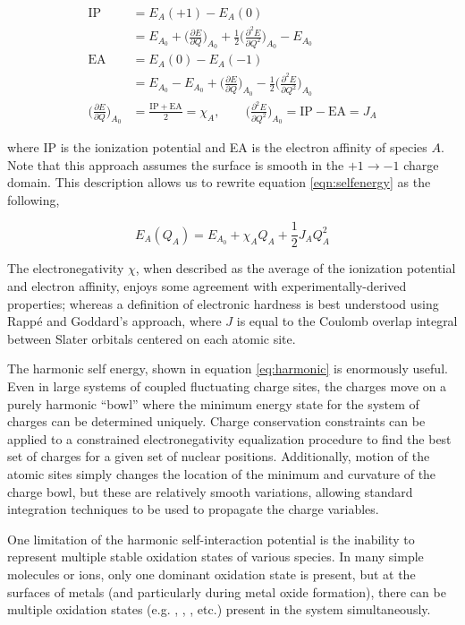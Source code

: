 \begin{align*}
\mathrm{IP} &= E_A(+1) - E_A(0) \\
& = E_{A_0} + \bigg (\frac{\partial E}{\partial Q}\bigg)_{A_0} + \frac{1}{2}\bigg(\frac{\partial^2E}{\partial Q^2}\bigg)_{A_0} - E_{A_0} \\
\mathrm{EA} &= E_A(0) - E_A(-1) \\
& = E_{A_0} - E_{A_0} + \bigg (\frac{\partial E}{\partial Q}\bigg)_{A_0} - \frac{1}{2}\bigg(\frac{\partial^2E}{\partial Q^2}\bigg)_{A_0}  \\
\bigg (\frac{\partial E}{\partial Q}\bigg)_{A_0} &= \frac{\mathrm{IP+EA}}{2} = \chi_A ,\qquad \bigg (\frac{\partial^2 E}{\partial Q^2}\bigg)_{A_0} = \mathrm{IP-EA} = J_A
\end{align*}

where IP is the ionization potential and EA is the electron affinity of species
$A$.  Note that this approach assumes the surface is smooth in the
$+1 \rightarrow -1$ charge domain. This description allows us to rewrite equation
\ref{eqn:selfenergy} as the following,

\begin{equation}
E_A(Q_A) = E_{A_0} + \chi_A Q_A + \frac{1}{2} J_{A} Q_A^2
\label{eq:harmonic}
\end{equation}

The electronegativity $\chi$, when described as the average of the ionization
potential and electron affinity, enjoys some agreement with experimentally-derived properties; whereas a
definition of electronic hardness is best understood using Rapp\'e and
Goddard's approach, where $J$ is equal to the Coulomb overlap integral between
Slater orbitals centered on each atomic site\citep{Rappe:1991dq}.

The harmonic self energy, shown in equation \ref{eq:harmonic} is enormously useful.
Even in large systems of coupled fluctuating charge sites, the charges move on
a purely harmonic ``bowl'' where the minimum energy state for the system of
charges can be determined uniquely. Charge conservation constraints can be
applied to a constrained electronegativity equalization procedure to find the
best set of charges for a given set of nuclear positions.  Additionally, motion
of the atomic sites simply changes the location of the minimum and curvature of
the charge bowl, but these are relatively smooth variations, allowing standard
integration techniques to be used to propagate the charge variables.

One limitation of the harmonic self-interaction potential is the inability to
represent multiple stable oxidation states of various species. In many simple
molecules or ions, only one dominant oxidation state is present, but at the
surfaces of metals (and particularly during metal oxide formation), there can
be multiple oxidation states (e.g. , , , etc.)
present in the system simultaneously.

